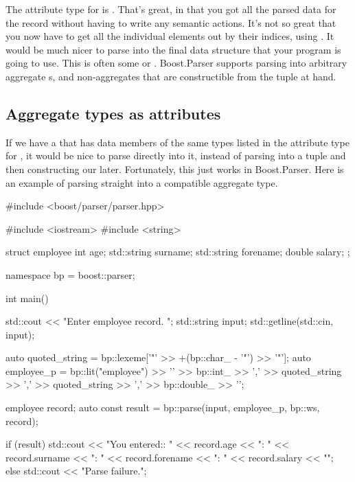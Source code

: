 \documentclass{MyBook}
\begin{document}
The attribute type for  is . That's great, in that you got all the parsed data for the record without having to write any semantic actions. It's not so great that you now have to get all the individual elements out by their indices, using . It would be much nicer to parse into the final data structure that your program is going to use. This is often some  or . Boost.Parser supports parsing into arbitrary aggregate s, and non-aggregates that are constructible from the tuple at hand.

\subsection{Aggregate types as attributes}

If we have a  that has data members of the same types listed in the  attribute type for , it would be nice to parse directly into it, instead of parsing into a tuple and then constructing our  later. Fortunately, this just works in Boost.Parser. Here is an example of parsing straight into a compatible aggregate type.

\begin{code}
#include <boost/parser/parser.hpp>

#include <iostream>
#include <string>


struct employee
{
    int age;
    std::string surname;
    std::string forename;
    double salary;
};

namespace bp = boost::parser;

int main()
{
    std::cout << "Enter employee record. ";
    std::string input;
    std::getline(std::cin, input);

    auto quoted_string = bp::lexeme['"' >> +(bp::char_ - '"') >> '"'];
    auto employee_p = bp::lit("employee")
        >> '{'
        >> bp::int_ >> ','
        >> quoted_string >> ','
        >> quoted_string >> ','
        >> bp::double_
        >> '}';

    employee record;
    auto const result = bp::parse(input, employee_p, bp::ws, record);

    if (result) {
        std::cout << "You entered:\nage:      " << record.age
                  << "\nsurname:  " << record.surname
                  << "\nforename: " << record.forename
                  << "\nsalary  : " << record.salary << "\n";
    } else {
        std::cout << "Parse failure.\n";
    }
}
\end{code}
\end{document}
